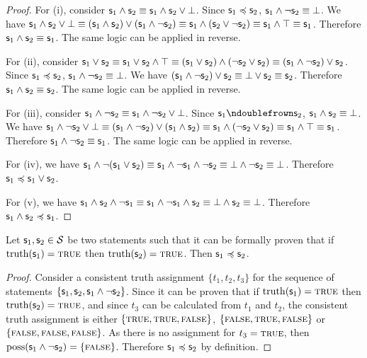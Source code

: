 \documentclass[11pt,letterpaper,fleqn]{memoir} %
\begin{document}
\begin{mathSection}
\begin{proof}
	For (i), consider $\mathsf{s}_1 \wedge \mathsf{s}_2 \equiv \mathsf{s}_1 \wedge \mathsf{s}_2 \vee \bot$. Since $\mathsf{s}_1 \preccurlyeq \mathsf{s}_2$, $\mathsf{s}_1 \wedge \neg \mathsf{s}_2 \equiv \bot$. We have $\mathsf{s}_1 \wedge \mathsf{s}_2 \vee \bot \equiv ( \mathsf{s}_1 \wedge \mathsf{s}_2 ) \vee (\mathsf{s}_1 \wedge \neg \mathsf{s}_2) \equiv \mathsf{s}_1 \wedge (\mathsf{s}_2 \vee \neg \mathsf{s}_2) \equiv \mathsf{s}_1 \wedge \top \equiv \mathsf{s}_1$. Therefore $\mathsf{s}_1 \wedge \mathsf{s}_2 \equiv \mathsf{s}_1$. The same logic can be applied in reverse.
	
	For (ii), consider $\mathsf{s}_1 \vee \mathsf{s}_2 \equiv \mathsf{s}_1 \vee \mathsf{s}_2 \wedge \top \equiv (\mathsf{s}_1 \vee \mathsf{s}_2) \wedge (\neg \mathsf{s}_2 \vee \mathsf{s}_2) \equiv (\mathsf{s}_1 \wedge \neg \mathsf{s}_2) \vee \mathsf{s}_2$. Since $\mathsf{s}_1 \preccurlyeq \mathsf{s}_2$, $\mathsf{s}_1 \wedge \neg \mathsf{s}_2 \equiv \bot$. We have $(\mathsf{s}_1 \wedge \neg \mathsf{s}_2) \vee \mathsf{s}_2 \equiv \bot \vee \mathsf{s}_2 \equiv \mathsf{s}_2$. Therefore $\mathsf{s}_1 \wedge \mathsf{s}_2 \equiv \mathsf{s}_2$. The same logic can be applied in reverse.

	For (iii), consider $\mathsf{s}_1 \wedge \neg \mathsf{s}_2 \equiv \mathsf{s}_1 \wedge \neg \mathsf{s}_2 \vee \bot$. Since $\stmt_1 \ncomp \stmt_2$, $\mathsf{s}_1 \wedge \mathsf{s}_2 \equiv \bot$. We have $\mathsf{s}_1 \wedge \neg \mathsf{s}_2 \vee \bot \equiv ( \mathsf{s}_1 \wedge \neg \mathsf{s}_2 ) \vee (\mathsf{s}_1 \wedge \mathsf{s}_2) \equiv \mathsf{s}_1 \wedge (\neg \mathsf{s}_2 \vee \mathsf{s}_2) \equiv \mathsf{s}_1 \wedge \top \equiv \mathsf{s}_1$. Therefore $\mathsf{s}_1 \wedge \neg \mathsf{s}_2 \equiv \mathsf{s}_1$. The same logic can be applied in reverse.
	
	For (iv), we have $\mathsf{s}_1 \wedge \neg (\mathsf{s}_1 \vee \mathsf{s}_2) \equiv \mathsf{s}_1 \wedge \neg \mathsf{s}_1 \wedge \neg \mathsf{s}_2 \equiv \bot \wedge \neg \mathsf{s}_2 \equiv \bot$. Therefore $\mathsf{s}_1 \preccurlyeq \mathsf{s}_1 \vee \mathsf{s}_2$.
	
	For (v), we have $\mathsf{s}_1 \wedge \mathsf{s}_2 \wedge \neg \mathsf{s}_1 \equiv \mathsf{s}_1 \wedge \neg \mathsf{s}_1 \wedge \mathsf{s}_2 \equiv \bot \wedge \mathsf{s}_2 \equiv \bot$. Therefore $\mathsf{s}_1 \wedge \mathsf{s}_2 \preccurlyeq \mathsf{s}_1$.
\end{proof}

\begin{prop}\label{prop_narrowness_is_if}
	Let $\mathsf{s}_1, \mathsf{s}_2 \in \mathcal{S}$ be two statements such that it can be formally proven that if $\operatorname{truth}(\mathsf{s}_1) = \textsc{true}$ then $\operatorname{truth}(\mathsf{s}_2) = \textsc{true}$. Then $\mathsf{s}_1 \preccurlyeq \mathsf{s}_2$.
\end{prop}

\begin{proof}
	Consider a consistent truth assignment $\{t_1, t_2, t_3\}$ for the sequence of statements $\{\mathsf{s}_1, \mathsf{s}_2, \mathsf{s}_1 \wedge \neg\mathsf{s}_2\}$. Since it can be proven that if $\operatorname{truth}(\mathsf{s}_1) = \textsc{true}$ then $\operatorname{truth}(\mathsf{s}_2) = \textsc{true}$, and since $t_3$ can be calculated from $t_1$ and $t_2$, the consistent truth assignment is either $\{\textsc{true}, \textsc{true}, \textsc{false}\}$, $\{\textsc{false}, \textsc{true}, \textsc{false}\}$ or $\{\textsc{false}, \textsc{false}, \textsc{false}\}$. As there is no assignment for $t_3=\textsc{true}$, then $\operatorname{poss}(\mathsf{s}_1 \wedge \neg\mathsf{s}_2) = \{\textsc{false}\}$. Therefore $\mathsf{s}_1 \preccurlyeq \mathsf{s}_2$ by definition.
\end{proof}


\end{mathSection}
\end{document}
